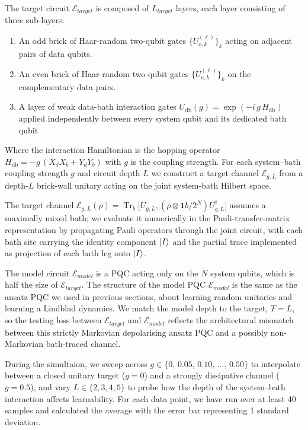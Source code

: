 \documentclass[%
 reprint,
superscriptaddress,
 amsmath,amssymb,
 aps,
]{revtex4-2}
\newcommand{\E}{\mathcal{E}}
\begin{document}
The target circuit $\E_{target}$ is composed of $L_{target}$ layers, each layer consisting of three sub-layers: 

\begin{enumerate}
    \item An odd brick of Haar-random two-qubit gates $\{U^{(\ell)}_{\mathrm{o},k}\}_k$ acting on adjacent pairs of data qubits.
    \item An even brick of Haar-random two-qubit gates $\{U^{(\ell)}_{\mathrm{e},k}\}_k$ on the complementary data pairs.
    \item A layer of weak data-bath interaction gates $U_{\mathrm{db}}(g) = \exp(-i\, g\, H_{\mathrm{db}})$ applied independently between every system qubit and its dedicated bath qubit
\end{enumerate} 

Where the interaction Hamiltonian is the hopping operator $H_{\mathrm{db}} = -g\,(X_d X_b + Y_d Y_b)$ with $g$ is the coupling strength. For each system--bath coupling strength $g$ and circuit depth $L$ we construct a target channel $\mathcal{E}_{g,L}$ from a depth-$L$ brick-wall unitary acting on the joint system-bath Hilbert space. 

The target channel $\mathcal{E}_{g,L}(\rho) = \operatorname{Tr}_{b}\bigl[U_{g,L},(\rho \otimes \mathbf{1}b/2^N)U_{g,L}^{\dagger}\bigr]$ assumes a maximally mixed bath; we evaluate it numerically in the Pauli-transfer-matrix representation by propagating Pauli operators through the joint circuit, with each bath site carrying the identity component $\ket{I}$ and the partial trace implemented as projection of each bath leg onto $\ket{I}$.

The model circuit $\E_{model}$ is a PQC acting only on the $N$ system qubits, which is half the size of $\E_{target}$. The structure of the model PQC $\E_{model}$ is the same as the ansatz PQC we used in previous sections, about learning random unitaries and learning a Lindblad dynamics. We match the model depth to the target, $T = L$, so the testing loss between $\E_{target}$ and $\E_{model}$ reflects the architectural mismatch between this strictly Markovian depolarising ansatz PQC and a possibly non-Markovian bath-traced channel.

During the simultaion, we sweep across $g \in \{0,\, 0.05,\, 0.10,\, \dots,\, 0.50\}$ to interpolate between a closed unitary target ($g=0$) and a strongly dissipative channel ($g=0.5$), and vary $L \in \{2,3,4,5\}$ to probe how the depth of the system--bath interaction affects learnability. For each data point, we have run over at least 40 samples and calculated the average with the error bar representing 1 standard deviation.
\end{document}
